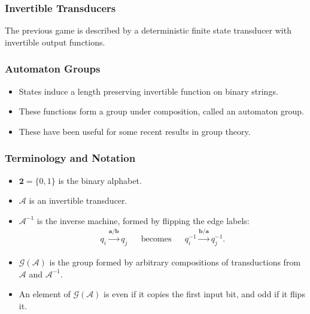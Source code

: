 \documentclass{beamer}
\newcommand{\ch}[1]{\mathbf{#1}}
\newcommand{\A}{\mathcal{A}}
\newcommand{\gp}{\mathcal{G}}
\newcommand{\bin}{\pmb{\bm{2}}}
\begin{document}
\begin{frame}
    \frametitle{Invertible Transducers}
    The previous game is described by a deterministic finite state transducer
    with invertible output functions.
    \begin{center}
        \usebox{\ccc}
    \end{center}
\end{frame}

\begin{frame}
    \frametitle{Automaton Groups}
    \begin{itemize}
            \item<1-> States induce a length preserving invertible function on
                binary strings.
            \item<2-> These functions form a group under composition, called an
                \alert{automaton group}.
            \item<3-> These have been useful for some recent results in group
                theory.
    \end{itemize}
    \pause
    \pause
    \pause
    \begin{center}
        \usebox{\grigorchuk}
    \end{center}
\end{frame}

\begin{frame}
    \frametitle{Terminology and Notation}
    \begin{itemize}
        \item<1-> $\bin = \{0, 1\}$ is the binary alphabet.
        \item<2-> $\A$ is an invertible transducer.
        \item<3-> $\A^{-1}$ is the inverse machine, formed by flipping the edge
            labels:
            \begin{align*}
                q_i \xrightarrow{\ch{a} / \ch{b}} q_j
                && \text{becomes} &&
                q_i^{-1} \xrightarrow{\ch{b} / \ch{a}} q_j^{-1}.
            \end{align*}
        \item<4-> $\gp(\A)$ is the group formed by arbitrary compositions of
            transductions from $\A$ and $\A^{-1}$.
        \item<5-> An element of $\gp(\A)$ is \alert{even} if it copies the
            first input bit, and \alert{odd} if it flips it.
    \end{itemize}
\end{frame}
\end{document}
